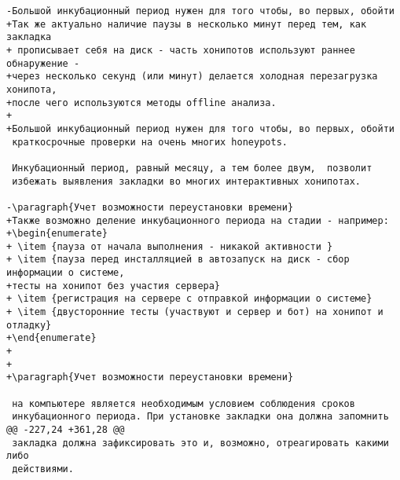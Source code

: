 \begin{verbatim}
-Большой инкубационный период нужен для того чтобы, во первых, обойти
+Так же актуально наличие паузы в несколько минут перед тем, как закладка
+ прописывает себя на диск - часть хонипотов используют раннее обнаружение -
+через несколько секунд (или минут) делается холодная перезагрузка хонипота,
+после чего используются методы offline анализа.
+
+Большой инкубационный период нужен для того чтобы, во первых, обойти
 краткосрочные проверки на очень многих honeypots.

 Инкубационный период, равный месяцу, а тем более двум,  позволит
 избежать выявления закладки во многих интерактивных хонипотах.

-\paragraph{Учет возможности переустановки времени}
+Также возможно деление инкубационного периода на стадии - например:
+\begin{enumerate}
+ \item {пауза от начала выполнения - никакой активности }
+ \item {пауза перед инсталляцией в автозапуск на диск - сбор информации о системе,
+тесты на хонипот без участия сервера}
+ \item {регистрация на сервере с отправкой информации о системе}
+ \item {двусторонние тесты (участвуют и сервер и бот) на хонипот и отладку}
+\end{enumerate}
+
+
+\paragraph{Учет возможности переустановки времени}

 на компьютере является необходимым условием соблюдения сроков
 инкубационного периода. При установке закладки она должна запомнить
@@ -227,24 +361,28 @@
 закладка должна зафиксировать это и, возможно, отреагировать какими либо
 действиями.


\end{verbatim}

